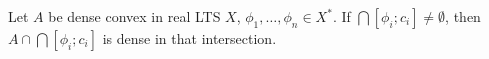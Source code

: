 Let $A$ be dense convex in real LTS $X$, $\phi_1,\ldots,\phi_n\in X^*$. If $\bigcap[\phi_i;c_i]\neq\emptyset$, then $A\cap\bigcap[\phi_i;c_i]$ is dense in that intersection.
